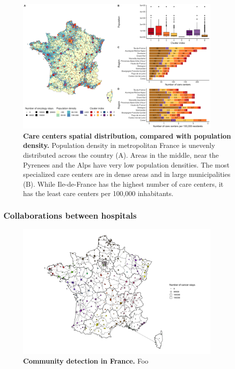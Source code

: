 \begin{figure}[h!]
    \includegraphics[width=0.9\textwidth]{images/camion/supplemental/sup_fig4_care_centers_pop_density.png}
    \centering
    \caption{ \textbf{Care centers spatial distribution, compared with
            population density.} Population density in metropolitan France is
        unevenly distributed across the country (A). Areas in the middle, near
        the Pyrenees and the Alps have very low population densities. The most
        specialized care centers are in dense areas and in large municipalities
        (B). While Ile-de-France has the highest number of care centers, it has
        the least care centers per 100,000 inhabitants. }
    \label{fig:clustering-map}
\end{figure}

\subsubsection{Collaborations between hospitals}

\begin{figure}[h!]
    \includegraphics[width=0.9\textwidth]{images/co-occurrences/fig1.png}
    \centering
    \caption{ \textbf{Community detection in France.} Foo }
    \label{fig:co-occ-france}
\end{figure}

